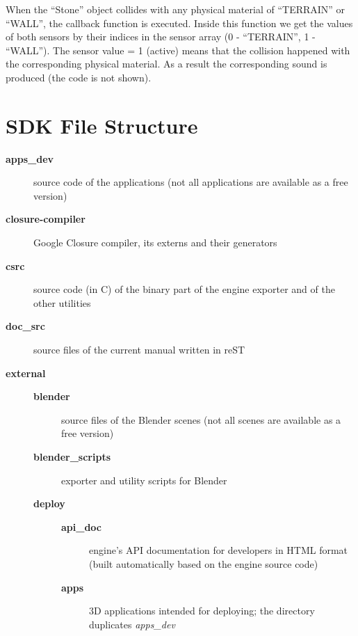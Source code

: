 \documentclass[a4paper,12pt,oneside]{sphinxmanual}
\begin{document}
When the ``Stone'' object collides with any physical material of ``TERRAIN'' or ``WALL'', the callback function is executed. Inside this function we get the values of both sensors by their indices in the sensor array (0 - ``TERRAIN'', 1 - ``WALL''). The sensor value = 1 (active) means that the collision happened with the corresponding physical material. As a result the corresponding sound is produced (the code is not shown).


\section{SDK File Structure}
\label{developers:repo-file-structure}\label{developers:sdk}\begin{description}
\item[{\textbf{apps\_dev}}] \leavevmode
source code of the applications (not all applications are available as a free version)

\item[{\textbf{closure-compiler}}] \leavevmode
Google Closure compiler, its externs and their generators

\item[{\textbf{csrc}}] \leavevmode
source code (in C) of the binary part of the engine exporter and of the other utilities

\item[{\textbf{doc\_src}}] \leavevmode
source files of the current manual written in reST

\item[{\textbf{external}}] \leavevmode\begin{description}
\item[{\textbf{blender}}] \leavevmode
source files of the Blender scenes (not all scenes are available as a free version)

\item[{\textbf{blender\_scripts}}] \leavevmode
exporter and utility scripts for Blender

\item[{\textbf{deploy}}] \leavevmode\begin{description}
\item[{\textbf{api\_doc}}] \leavevmode
engine's API documentation for developers in HTML format (built automatically based on the engine source code)

\item[{\textbf{apps}}] \leavevmode
3D applications intended for deploying; the directory duplicates \emph{apps\_dev}


\end{description}
\end{description}
\end{description}
\end{document}
